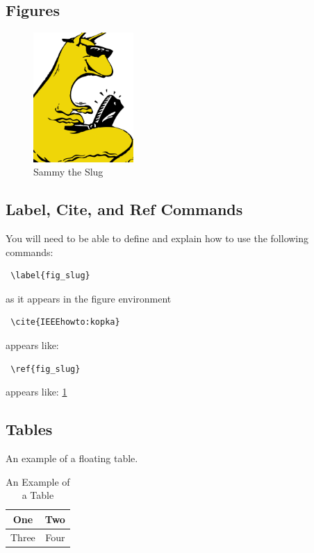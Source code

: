 \documentclass[12pt,journal,compsoc]{IEEEtran}
\begin{document}
\subsection{Figures}

\begin{figure}[h] 	%
\centering
\includegraphics[width=1.5in]{slug.pdf}
\caption{Sammy the Slug}
\label{fig_slug}
\end{figure}

\subsection{Label, Cite, and Ref Commands}
You will need to be able to define and explain how to use the following commands:
\begin{verbatim} \label{fig_slug} \end{verbatim} as it appears in the figure environment\\
\begin{verbatim} \cite{IEEEhowto:kopka} \end{verbatim} appears like: \cite{IEEEhowto:kopka}\\
\begin{verbatim} \ref{fig_slug} \end{verbatim} appears like: \ref{fig_slug}\\ 

\subsection{Tables}
An example of a floating table.
%
\begin{table}[h]
\renewcommand{\arraystretch}{1.3}
\caption{An Example of a Table}
\label{table_example}
\centering
\begin{tabular}{|c||c|}
\hline
One & Two\\
\hline
Three & Four\\
\hline
\end{tabular}
\end{table}
\end{document}

